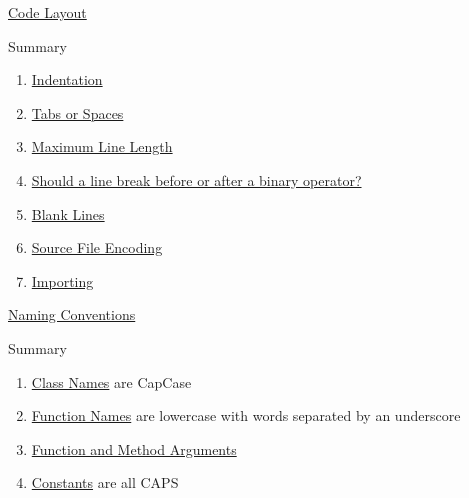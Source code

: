 \documentclass{beamer}
\begin{document}

\begin{frame}{\href{https://www.python.org/dev/peps/pep-0008/\#code-lay-out}{Code Layout}}

Summary

\begin{enumerate}
    \item \href{https://www.python.org/dev/peps/pep-0008/\#indentation}{Indentation}
    \item \href{https://www.python.org/dev/peps/pep-0008/\#tabs-or-spaces}{Tabs or Spaces}
    \item \href{https://www.python.org/dev/peps/pep-0008/\#maximum-line-length}{Maximum Line Length}
    \item \href{https://www.python.org/dev/peps/pep-0008/\#should-a-line-break-before-or-after-a-binary-operator}{Should a line break before or after a binary operator?}
    \item \href{https://www.python.org/dev/peps/pep-0008/\#blank-lines}{Blank Lines}
    \item \href{https://www.python.org/dev/peps/pep-0008/\#source-file-encoding}{Source File Encoding}
    \item \href{https://www.python.org/dev/peps/pep-0008/\#imports}{Importing}
\end{enumerate}

\end{frame}

\begin{frame}{\href{https://www.python.org/dev/peps/pep-0008/\#naming-conventions}{Naming Conventions}}

Summary

\begin{enumerate}
    \item \href{https://www.python.org/dev/peps/pep-0008/\#class-names}{Class Names} are CapCase
    \item \href{https://www.python.org/dev/peps/pep-0008/\#function-names}{Function Names} are lowercase with words separated by an underscore
    \item \href{https://www.python.org/dev/peps/pep-0008/\#function-and-method-arguments}{Function and Method Arguments}
    \item \href{https://www.python.org/dev/peps/pep-0008/\#constants}{Constants} are all CAPS
\end{enumerate}

\end{frame}
\end{document}
